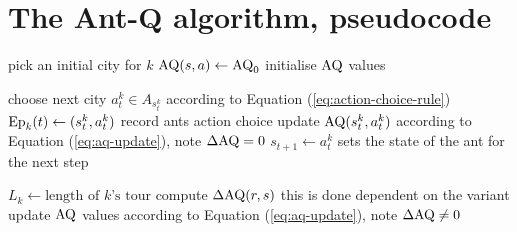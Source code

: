 \section{The Ant-Q algorithm, pseudocode}

\begin{algorithmic}
    \State pick an initial city for $k$
    \EndFor
    \State $\operatorname{AQ}(s, a) \gets \operatorname{AQ}_0$
    \Comment initialise $\operatorname{AQ}$ values
    \EndFor
    \EndFor
    \EndFunction
\end{algorithmic}
\begin{algorithmic}
    \State choose next city $a_t^k \in A_{s_t^k}$
    \Comment according to Equation (\ref{eq:action-choice-rule})
    \State $\operatorname{Ep}_k(t) \gets (s_t^k, a_t^k)$
    \Comment record ants action choice
    \EndFor
    \State update $\operatorname{AQ}(s_t^k, a_t^k)$
    \Comment according to Equation (\ref{eq:aq-update}), note $\operatorname{\Delta AQ} = 0$
    \State $s_{t+1} \gets a_t^k$
    \Comment sets the state of the ant for the next step
    \EndFor
    \EndFor
    \EndFunction
\end{algorithmic}
\begin{algorithmic}
    \State $L_k \gets \text{length of $k$'s tour}$
    \EndFor
    \State compute $\operatorname{\Delta AQ}(r, s)$
    \Comment this is done dependent on the variant
    \EndFor
    \EndFor
    \State update $\operatorname{AQ}$ values
    \Comment according to Equation (\ref{eq:aq-update}), note $\operatorname{\Delta AQ} \neq 0$
    \EndFunction
\end{algorithmic}
\begin{algorithmic}
    \State {}
    \State {}
    \State {}
    \EndWhile
    \EndFunction
\end{algorithmic}